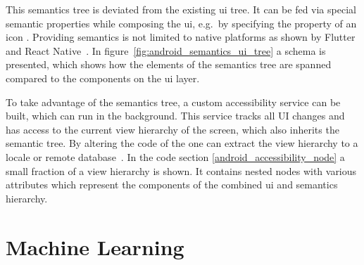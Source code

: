 This semantics tree is deviated from the existing \gls{ui} tree.
It can be fed via special semantic properties while composing the \gls{ui}, e.g.\ by specifying the  property of an icon \cite{android_semantics_compose}.
Providing semantics is not limited to native platforms as shown by Flutter~\cite{flutter_semantics} and React Native~\cite{react_native_accessibility}.
In figure~\ref{fig:android_semantics_ui_tree} a schema is presented, which shows how the elements of the semantics tree are spanned compared to the components on the \gls{ui} layer.

To take advantage of the semantics tree, a custom accessibility service can be built, which can run in the background.
This service tracks all UI changes and has access to the current view hierarchy of the screen, which also inherits the semantic tree.
By altering the code of the  one can extract the view hierarchy to a locale or remote database~\cite{android_accessibility_node_info_dumper}.
In the code section \ref{android_accessibility_node} a small fraction of a view hierarchy is shown.
It contains nested nodes with various attributes which represent the components of the combined \gls{ui} and semantics hierarchy.





\section{Machine Learning}
\label{sec:machine-learning}

